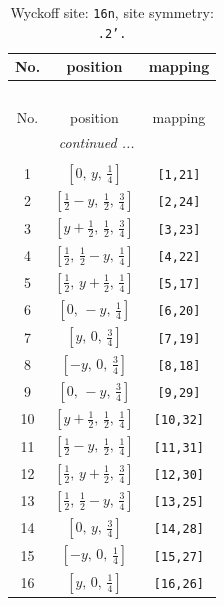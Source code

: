 \documentclass[fleqn,8pt]{jsarticle}
\begin{document}
\begin{longtable}{ccc}
\caption{Wyckoff site: {\tt 16n}, site symmetry: {\tt .2'.}}
 \\
 \hline \hline
No. & position & mapping \\ \hline \endfirsthead

\multicolumn{2}{l}{\tablename\ \thetable{}} \\
 \hline \hline
No. & position & mapping \\ \hline \endhead

 \hline \hline
\multicolumn{2}{r}{\footnotesize\it continued ...} \\ \endfoot

 \hline \hline
\multicolumn{2}{r}{} \\ \endlastfoot

1 & $\left[ 0,\, y,\, \frac{1}{4} \right]$ & {\tt [1,21]} \\ \hline
2 & $\left[ \frac{1}{2} - y,\, \frac{1}{2},\, \frac{3}{4} \right]$ & {\tt [2,24]} \\ \hline
3 & $\left[ y + \frac{1}{2},\, \frac{1}{2},\, \frac{3}{4} \right]$ & {\tt [3,23]} \\ \hline
4 & $\left[ \frac{1}{2},\, \frac{1}{2} - y,\, \frac{1}{4} \right]$ & {\tt [4,22]} \\ \hline
5 & $\left[ \frac{1}{2},\, y + \frac{1}{2},\, \frac{1}{4} \right]$ & {\tt [5,17]} \\ \hline
6 & $\left[ 0,\, - y,\, \frac{1}{4} \right]$ & {\tt [6,20]} \\ \hline
7 & $\left[ y,\, 0,\, \frac{3}{4} \right]$ & {\tt [7,19]} \\ \hline
8 & $\left[ - y,\, 0,\, \frac{3}{4} \right]$ & {\tt [8,18]} \\ \hline
9 & $\left[ 0,\, - y,\, \frac{3}{4} \right]$ & {\tt [9,29]} \\ \hline
10 & $\left[ y + \frac{1}{2},\, \frac{1}{2},\, \frac{1}{4} \right]$ & {\tt [10,32]} \\ \hline
11 & $\left[ \frac{1}{2} - y,\, \frac{1}{2},\, \frac{1}{4} \right]$ & {\tt [11,31]} \\ \hline
12 & $\left[ \frac{1}{2},\, y + \frac{1}{2},\, \frac{3}{4} \right]$ & {\tt [12,30]} \\ \hline
13 & $\left[ \frac{1}{2},\, \frac{1}{2} - y,\, \frac{3}{4} \right]$ & {\tt [13,25]} \\ \hline
14 & $\left[ 0,\, y,\, \frac{3}{4} \right]$ & {\tt [14,28]} \\ \hline
15 & $\left[ - y,\, 0,\, \frac{1}{4} \right]$ & {\tt [15,27]} \\ \hline
16 & $\left[ y,\, 0,\, \frac{1}{4} \right]$ & {\tt [16,26]} \\
\end{longtable}
\end{document}
